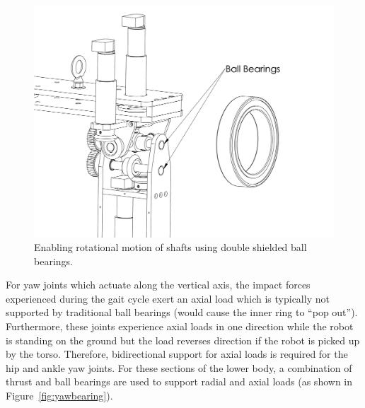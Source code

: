\begin{figure}[!h]
	\begin{center}
    \includegraphics[scale=0.5]{fig/design/ballbearings.pdf}
	\end{center}
  \caption{Enabling rotational motion of shafts using double shielded ball bearings.}
\label{fig:ballb}
\end{figure}

For yaw joints which actuate along the vertical axis, the impact forces experienced during the gait cycle exert an axial load which is typically not supported by traditional ball bearings (would cause the inner ring to ``pop out''). Furthermore, these joints experience axial loads in one direction while the robot is standing on the ground but the load reverses direction if the robot is picked up by the torso. Therefore, bidirectional support for axial loads is required for the hip and ankle yaw joints. For these sections of the lower body, a combination of thrust and ball bearings are used to support radial and axial loads (as shown in Figure~\ref{fig:yawbearing}). 

